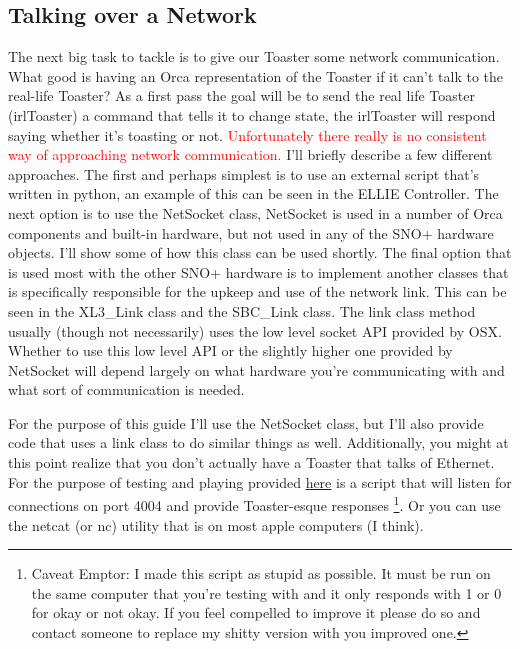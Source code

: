 \documentclass[12pt,a4paper]{article}
\begin{document}
\subsection{Talking over a Network}
The next big task to tackle is to give our Toaster some network communication.
What good is having an Orca representation of the Toaster if it can't talk to the real-life Toaster?
As a first pass the goal will be to send the real life Toaster (irlToaster) a command that tells it to change state, the irlToaster will respond saying whether it's toasting or not.
\textcolor{red}{Unfortunately there really is no consistent way of approaching network communication.}
I'll briefly describe a few different approaches.
The first and perhaps simplest is to use an external script that's written in python, an example of this can be seen in the ELLIE Controller.
The next option is to use the NetSocket class, NetSocket is used in a number of Orca components and built-in hardware, but not used in any of the SNO+ hardware objects.
 I'll show some of how this class can be used shortly.
The final option that is used most with the other SNO+ hardware is to implement another classes that is specifically responsible for the upkeep and use of the network link. 
This can be seen in the XL3\_Link class and the SBC\_Link class.
The link class method usually (though not necessarily) uses the low level socket API provided by OSX.
Whether to use this low level API or the slightly higher one provided by NetSocket will depend largely on what hardware you're communicating with and what sort of communication is needed.

For the purpose of this guide I'll use the NetSocket class, but I'll also provide code that uses a link class to do similar things as well.
Additionally, you might at this point realize that you don't actually have a Toaster that talks of Ethernet. 
For the purpose of testing and playing provided \href{LinkToScript}{here} is a script that will listen for connections on port 4004 and provide Toaster-esque responses
\footnote{Caveat Emptor: I made this script as stupid as possible.
 It must be run on the same computer that you're testing with and it only responds with 1 or 0 for okay or not okay.
  If you feel compelled to improve it please do so and contact someone to replace my shitty version with you improved one.}.
  Or you can use the netcat (or nc) utility that is on most apple computers (I think).
  
\end{document}
